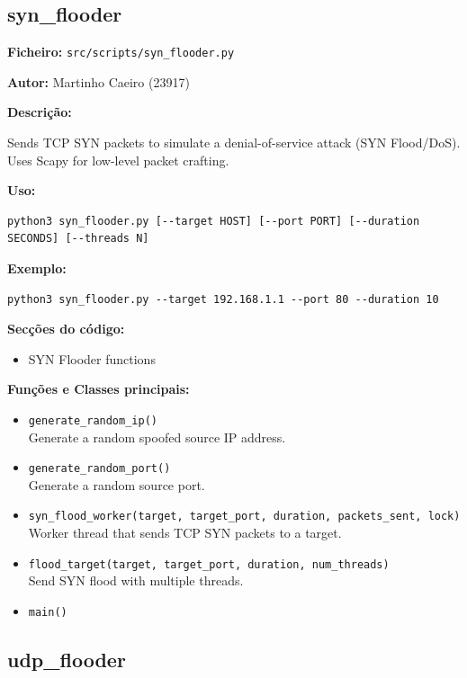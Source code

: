 \documentclass[a4paper,11pt]{article}
\begin{document}
\newpage
\subsection{syn\_flooder}
\label{sec:syn_flooder}

\textbf{Ficheiro:} \texttt{src/scripts/syn\_flooder.py}

\textbf{Autor:} Martinho Caeiro (23917)

\textbf{Descrição:}

Sends TCP SYN packets to simulate a denial-of-service attack (SYN Flood/DoS).
Uses Scapy for low-level packet crafting.

\textbf{Uso:}
\begin{verbatim}
python3 syn_flooder.py [--target HOST] [--port PORT] [--duration SECONDS] [--threads N]
\end{verbatim}

\textbf{Exemplo:}
\begin{verbatim}
python3 syn_flooder.py --target 192.168.1.1 --port 80 --duration 10
\end{verbatim}

\textbf{Secções do código:}
\begin{itemize}
    \item SYN Flooder functions
\end{itemize}

\textbf{Funções e Classes principais:}
\begin{itemize}
    \item \texttt{generate\_random\_ip()}
    \\ Generate a random spoofed source IP address.
    \item \texttt{generate\_random\_port()}
    \\ Generate a random source port.
    \item \texttt{syn\_flood\_worker(target, target\_port, duration, packets\_sent, lock)}
    \\ Worker thread that sends TCP SYN packets to a target.
    \item \texttt{flood\_target(target, target\_port, duration, num\_threads)}
    \\ Send SYN flood with multiple threads.
    \item \texttt{main()}
\end{itemize}

\newpage
\subsection{udp\_flooder}
\label{sec:udp_flooder}
\end{document}
